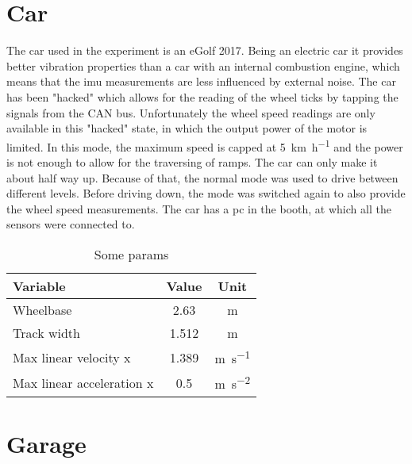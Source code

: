 \section{Car}
The car used in the experiment is an eGolf 2017.
Being an electric car it provides better vibration properties than a car with an internal combustion engine, which means that the \gls{imu} measurements are less influenced by external noise.
The car has been "hacked" which allows for the reading of the wheel ticks by tapping the signals from the CAN bus.
Unfortunately the wheel speed readings are only available in this "hacked" state, in which the output power of the motor is limited.
In this mode, the maximum speed is capped at \SI{5}{\kilo\metre\per\hour} and the power is not enough to allow for the traversing of ramps.
The car can only make it about half way up.
Because of that, the normal mode was used to drive between different levels.
Before driving down, the mode was switched again to also provide the wheel speed measurements.
The car has a pc in the booth, at which all the sensors were connected to.
\begin{table}[htbp]
	\centering
	\caption{Some params}
	\label{tab:car_parameters}
	\begin{tabular}[t]{lcc}
		\toprule
		\textbf{Variable}         & \textbf{Value} & \textbf{Unit}                  \\
		\midrule
		Wheelbase                 & 2.63           & \si{\metre}                    \\
		Track width               & 1.512          & \si{\metre}                    \\
		Max linear velocity x     & 1.389          & \si{\metre\per\second}         \\
		Max linear acceleration x & 0.5            & \si{\metre\per\second\squared} \\
		\bottomrule
	\end{tabular}
\end{table}



\section{Garage}
